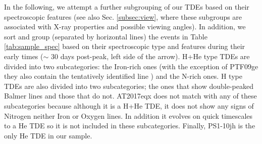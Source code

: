 \documentclass[structabstract]{aa}
\begin{document}
In the following, we attempt a further subgrouping of our TDEs based on their spectroscopic features (see also Sec. \ref{subsec:view}, where these subgroups are associated with X-ray properties and possible viewing angles). 
In addition, we sort and group (separated by horizontal lines) the events in Table \ref{tab:sample_spec} based on their spectroscopic type  and features during their early times ($\sim$ 30 days post-peak, left side of the arrow). 
H+He type TDEs are divided into two subcategories: the Iron-rich ones (with the exception of PTF09ge they also contain the tentatively identified  line \citep{Wevers2019}) and the N-rich ones. H type TDEs are also divided into two subcategories; the ones that show double-peaked Balmer lines and those that do not. AT2017eqx does not match with any of these subcategories because although it is a H+He TDE, it does not show any signs of Nitrogen neither Iron or Oxygen lines. In addition it evolves on quick timescales to a He TDE so it is not included in these subcategories. Finally, PS1-10jh is the only He TDE in our sample.
\end{document}
